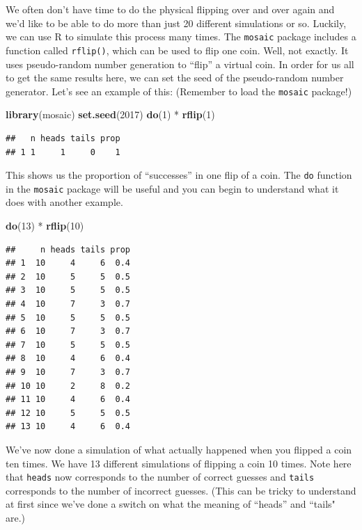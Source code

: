 \documentclass[]{tufte-book}
\newenvironment{Shaded}{\begin{snugshade}}{\end{snugshade}}
\newcommand{\KeywordTok}[1]{\textcolor[rgb]{0.13,0.29,0.53}{\textbf{{#1}}}}
\newcommand{\DecValTok}[1]{\textcolor[rgb]{0.00,0.00,0.81}{{#1}}}
\newcommand{\StringTok}[1]{\textcolor[rgb]{0.31,0.60,0.02}{{#1}}}
\newcommand{\NormalTok}[1]{{#1}}
\theoremstyle{definition}
\theoremstyle{definition}
\theoremstyle{remark}
\begin{document}
We often don't have time to do the physical flipping over and over again
and we'd like to be able to do more than just 20 different simulations
or so. Luckily, we can use R to simulate this process many times. The
\texttt{mosaic} package includes a function called \texttt{rflip()},
which can be used to flip one coin. Well, not exactly. It uses
pseudo-random number generation to ``flip'' a virtual coin. In order for
us all to get the same results here, we can set the seed of the
pseudo-random number generator. Let's see an example of this: (Remember
to load the \texttt{mosaic} package!)

\begin{Shaded}
\begin{Highlighting}[]
\KeywordTok{library}\NormalTok{(mosaic)}
\KeywordTok{set.seed}\NormalTok{(}\DecValTok{2017}\NormalTok{)}
\KeywordTok{do}\NormalTok{(}\DecValTok{1}\NormalTok{) *}\StringTok{ }\KeywordTok{rflip}\NormalTok{(}\DecValTok{1}\NormalTok{)}
\end{Highlighting}
\end{Shaded}

\begin{verbatim}
##   n heads tails prop
## 1 1     1     0    1
\end{verbatim}

This shows us the proportion of ``successes'' in one flip of a coin. The
\texttt{do} function in the \texttt{mosaic} package will be useful and
you can begin to understand what it does with another example.

\begin{Shaded}
\begin{Highlighting}[]
\KeywordTok{do}\NormalTok{(}\DecValTok{13}\NormalTok{) *}\StringTok{ }\KeywordTok{rflip}\NormalTok{(}\DecValTok{10}\NormalTok{)}
\end{Highlighting}
\end{Shaded}

\begin{verbatim}
##     n heads tails prop
## 1  10     4     6  0.4
## 2  10     5     5  0.5
## 3  10     5     5  0.5
## 4  10     7     3  0.7
## 5  10     5     5  0.5
## 6  10     7     3  0.7
## 7  10     5     5  0.5
## 8  10     4     6  0.4
## 9  10     7     3  0.7
## 10 10     2     8  0.2
## 11 10     4     6  0.4
## 12 10     5     5  0.5
## 13 10     4     6  0.4
\end{verbatim}

We've now done a simulation of what actually happened when you flipped a
coin ten times. We have 13 different simulations of flipping a coin 10
times. Note here that \texttt{heads} now corresponds to the number of
correct guesses and \texttt{tails} corresponds to the number of
incorrect guesses. (This can be tricky to understand at first since
we've done a switch on what the meaning of ``heads'' and ``tails" are.)
\end{document}
